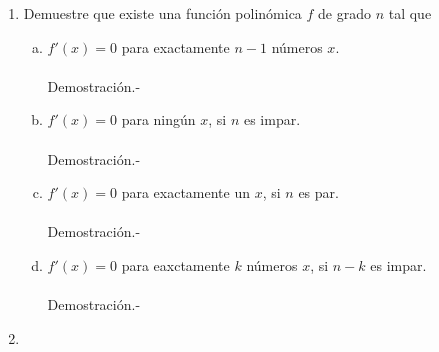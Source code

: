 \begin{enumerate}[\bfseries 1.]
\begin{enumerate}[(a)]
	 \end{enumerate}

     \item Demuestre que existe una función polinómica $f$ de grado $n$ tal que\\
	 \begin{enumerate}[(a)]

	     \item $f'(x)=0$ para exactamente $n-1$ números $x$.\\\\
		 Demostración.-\; 

	     \item $f'(x)=0$ para ningún $x$, si $n$ es impar.\\\\
		 Demostración.-\; 

	     \item $f'(x)=0$ para exactamente un $x$, si $n$ es par.\\\\
		 Demostración.-\;

	     \item $f'(x)=0$ para eaxctamente $k$ números $x$, si $n-k$ es impar.\\\\
		 Demostración.-\;

	 \end{enumerate}

     \item 
    

\end{enumerate}

